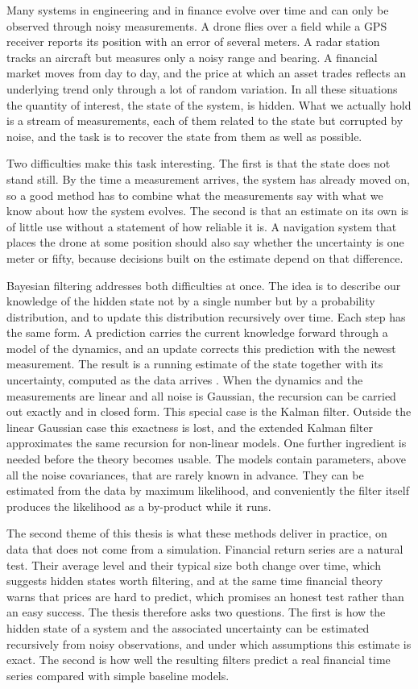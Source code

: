 Many systems in engineering and in finance evolve over time and can only be observed through noisy measurements. A drone flies over a field while a GPS receiver reports its position with an error of several meters. A radar station tracks an aircraft but measures only a noisy range and bearing. A financial market moves from day to day, and the price at which an asset trades reflects an underlying trend only through a lot of random variation. In all these situations the quantity of interest, the state of the system, is hidden. What we actually hold is a stream of measurements, each of them related to the state but corrupted by noise, and the task is to recover the state from them as well as possible.

Two difficulties make this task interesting. The first is that the state does not stand still. By the time a measurement arrives, the system has already moved on, so a good method has to combine what the measurements say with what we know about how the system evolves. The second is that an estimate on its own is of little use without a statement of how reliable it is. A navigation system that places the drone at some position should also say whether the uncertainty is one meter or fifty, because decisions built on the estimate depend on that difference.

Bayesian filtering addresses both difficulties at once. The idea is to describe our knowledge of the hidden state not by a single number but by a probability distribution, and to update this distribution recursively over time. Each step has the same form. A prediction carries the current knowledge forward through a model of the dynamics, and an update corrects this prediction with the newest measurement. The result is a running estimate of the state together with its uncertainty, computed as the data arrives \cite[Ch.~1]{sarkka:bayesian_filtering}. When the dynamics and the measurements are linear and all noise is Gaussian, the recursion can be carried out exactly and in closed form. This special case is the Kalman filter. Outside the linear Gaussian case this exactness is lost, and the extended Kalman filter approximates the same recursion for non-linear models. One further ingredient is needed before the theory becomes usable. The models contain parameters, above all the noise covariances, that are rarely known in advance. They can be estimated from the data by maximum likelihood, and conveniently the filter itself produces the likelihood as a by-product while it runs.

The second theme of this thesis is what these methods deliver in practice, on data that does not come from a simulation. Financial return series are a natural test. Their average level and their typical size both change over time, which suggests hidden states worth filtering, and at the same time financial theory warns that prices are hard to predict, which promises an honest test rather than an easy success. The thesis therefore asks two questions. The first is how the hidden state of a system and the associated uncertainty can be estimated recursively from noisy observations, and under which assumptions this estimate is exact. The second is how well the resulting filters predict a real financial time series compared with simple baseline models. 

